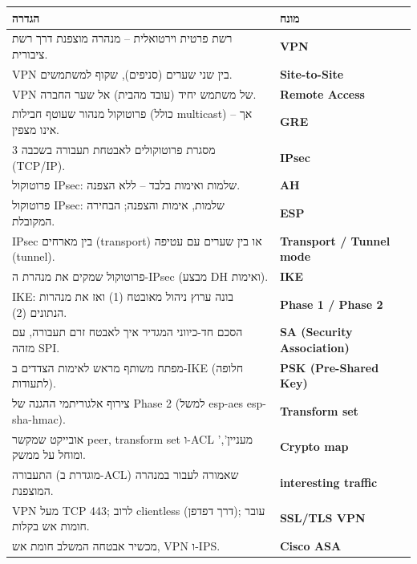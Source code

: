 \documentclass[11pt]{article}
\newcommand{\enLR}[1]{\textenglish{#1}}
\begin{document}
\begin{xltabular}{\linewidth}{|>{\setRTL\raggedleft\arraybackslash}X|>{\setRTL\raggedleft\arraybackslash}X|}
\hline
{}\textbf{הגדרה} & \textbf{מונח} \\
\hline
\endhead
רשת פרטית וירטואלית – מנהרה מוצפנת דרך רשת ציבורית. & \textbf{\enLR{VPN}} \\
\hline
\enLR{VPN} בין שני שערים (סניפים), שקוף למשתמשים. & \textbf{\enLR{Site-to-Site}} \\
\hline
\enLR{VPN} של משתמש יחיד (עובד מהבית) אל שער החברה. & \textbf{\enLR{Remote Access}} \\
\hline
פרוטוקול מנהור שעוטף חבילות (כולל \enLR{multicast)} – אך אינו מצפין. & \textbf{\enLR{GRE}} \\
\hline
מסגרת פרוטוקולים לאבטחת תעבורה בשכבה \enLR{3 (TCP/IP).} & \textbf{\enLR{IPsec}} \\
\hline
פרוטוקול \enLR{IPsec}: שלמות ואימות בלבד – ללא הצפנה. & \textbf{\enLR{AH}} \\
\hline
פרוטוקול \enLR{IPsec}: שלמות, אימות והצפנה; הבחירה המקובלת. & \textbf{\enLR{ESP}} \\
\hline
\enLR{IPsec} בין מארחים \enLR{(transport)} או בין שערים עם עטיפה \enLR{(tunnel).} & \textbf{\enLR{Transport / Tunnel mode}} \\
\hline
פרוטוקול שמקים את מנהרת ה-\enLR{IPsec} (מבצע \enLR{DH} ואימות). & \textbf{\enLR{IKE}} \\
\hline
\enLR{IKE}: בונה ערוץ ניהול מאובטח \enLR{(1)} ואז את מנהרות הנתונים \enLR{(2).} & \textbf{\enLR{Phase 1 / Phase 2}} \\
\hline
הסכם חד-כיווני המגדיר איך לאבטח זרם תעבורה, עם מזהה \enLR{SPI.} & \textbf{\enLR{SA (Security Association)}} \\
\hline
מפתח משותף מראש לאימות הצדדים ב-\enLR{IKE} (חלופה לתעודות). & \textbf{\enLR{PSK (Pre-Shared Key)}} \\
\hline
צירוף אלגוריתמי ההגנה של \enLR{Phase 2} (למשל \enLR{esp-aes esp-sha-hmac).} & \textbf{\enLR{Transform set}} \\
\hline
אובייקט שמקשר \enLR{peer, transform set} ו-\enLR{ACL '}מעניין', ומוחל על ממשק. & \textbf{\enLR{Crypto map}} \\
\hline
התעבורה (מוגדרת ב-\enLR{ACL)} שאמורה לעבור במנהרה המוצפנת. & \textbf{\enLR{interesting traffic}} \\
\hline
\enLR{VPN} מעל \enLR{TCP 443}; לרוב \enLR{clientless} (דרך דפדפן); עובר חומות אש בקלות. & \textbf{\enLR{SSL/TLS VPN}} \\
\hline
מכשיר אבטחה המשלב חומת אש, \enLR{VPN} ו-\enLR{IPS.} & \textbf{\enLR{Cisco ASA}} \\
\hline
\end{xltabular}
\end{document}

